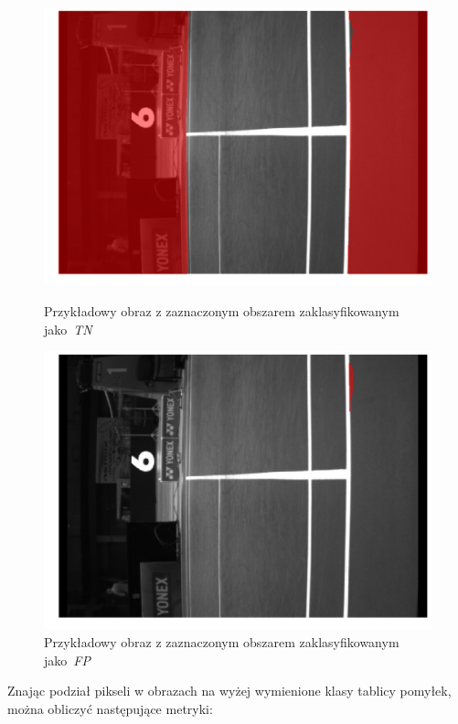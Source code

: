 \begin{figure}[!htb]
    \includegraphics[width=\linewidth]{TN_frame_8.jpg}
    \caption{Przykładowy obraz z zaznaczonym obszarem zaklasyfikowanym jako~\textit{TN}}
    \label{fig:TN}
  \endminipage\hfill
    \includegraphics[width=\linewidth]{FP_frame_8.jpg}
    \caption{Przykładowy obraz z zaznaczonym obszarem zaklasyfikowanym jako~\textit{FP}}
    \label{fig:FP}
  \endminipage\hfill
\end{figure}

Znając podział pikseli w obrazach na wyżej wymienione klasy tablicy pomyłek, można obliczyć następujące metryki:

